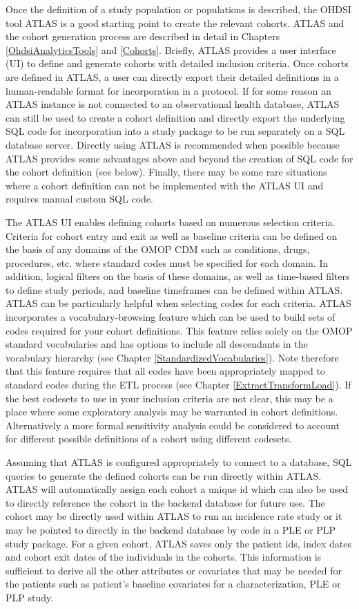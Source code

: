 \documentclass[11pt]{book}
\theoremstyle{definition}
\theoremstyle{definition}
\theoremstyle{definition}
\theoremstyle{remark}
\begin{document}
Once the definition of a study population or populations is described,
the OHDSI tool ATLAS is a good starting point to create the relevant
cohorts. ATLAS and the cohort generation process are described in detail
in Chapters \ref{OhdsiAnalyticsTools} and \ref{Cohorts}. Briefly, ATLAS
provides a user interface (UI) to define and generate cohorts with
detailed inclusion criteria. Once cohorts are defined in ATLAS, a user
can directly export their detailed definitions in a human-readable
format for incorporation in a protocol. If for some reason an ATLAS
instance is not connected to an observational health database, ATLAS can
still be used to create a cohort definition and directly export the
underlying SQL code for incorporation into a study package to be run
separately on a SQL database server. Directly using ATLAS is recommended
when possible because ATLAS provides some advantages above and beyond
the creation of SQL code for the cohort definition (see below). Finally,
there may be some rare situations where a cohort definition can not be
implemented with the ATLAS UI and requires manual custom SQL code.

The ATLAS UI enables defining cohorts based on numerous selection
criteria. Criteria for cohort entry and exit as well as baseline
criteria can be defined on the basis of any domains of the OMOP CDM such
as conditions, drugs, procedures, etc. where standard codes must be
specified for each domain. In addition, logical filters on the basis of
these domains, as well as time-based filters to define study periods,
and baseline timeframes can be defined within ATLAS. ATLAS can be
particularly helpful when selecting codes for each criteria. ATLAS
incorporates a vocabulary-browsing feature which can be used to build
sets of codes required for your cohort definitions. This feature relies
solely on the OMOP standard vocabularies and has options to include all
descendants in the vocabulary hierarchy (see Chapter
\ref{StandardizedVocabularies}). Note therefore that this feature
requires that all codes have been appropriately mapped to standard codes
during the ETL process (see Chapter \ref{ExtractTransformLoad}). If the
best codesets to use in your inclusion criteria are not clear, this may
be a place where some exploratory analysis may be warranted in cohort
definitions. Alternatively a more formal sensitivity analysis could be
considered to account for different possible definitions of a cohort
using different codesets.

Assuming that ATLAS is configured appropriately to connect to a
database, SQL queries to generate the defined cohorts can be run
directly within ATLAS. ATLAS will automatically assign each cohort a
unique id which can also be used to directly reference the cohort in the
backend database for future use. The cohort may be directly used within
ATLAS to run an incidence rate study or it may be pointed to directly in
the backend database by code in a PLE or PLP study package. For a given
cohort, ATLAS saves only the patient ids, index dates and cohort exit
dates of the individuals in the cohorts. This information is sufficient
to derive all the other attributes or covariates that may be needed for
the patients such as patient's baseline covariates for a
characterization, PLE or PLP study.
\end{document}
